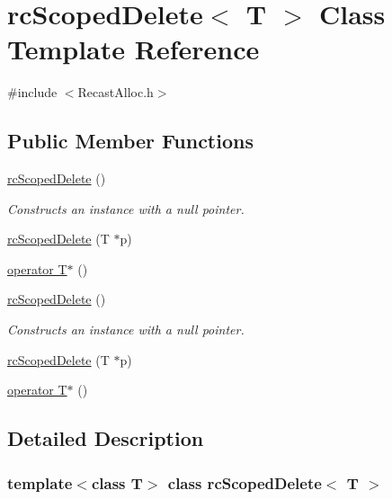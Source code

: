 \hypertarget{classrcScopedDelete}{}\section{rc\+Scoped\+Delete$<$ T $>$ Class Template Reference}
\label{classrcScopedDelete}


{\ttfamily \#include $<$Recast\+Alloc.\+h$>$}

\subsection*{Public Member Functions}
\begin{DoxyCompactItemize}
\item 
\mbox{\label{classrcScopedDelete_a24d9238f78295ccbd1050247030e3741}} 
\hyperlink{classrcScopedDelete_a24d9238f78295ccbd1050247030e3741}{rc\+Scoped\+Delete} ()
\begin{DoxyCompactList}\small\item\em Constructs an instance with a null pointer. \end{DoxyCompactList}\item 
\hyperlink{classrcScopedDelete_a2f096ff87f4d48259dd85360a4218155}{rc\+Scoped\+Delete} (T $\ast$p)
\item 
\hyperlink{classrcScopedDelete_a842c6cc65c3811faead9717aa53166dd}{operator T$\ast$} ()
\item 
\mbox{\label{classrcScopedDelete_a24d9238f78295ccbd1050247030e3741}} 
\hyperlink{classrcScopedDelete_a24d9238f78295ccbd1050247030e3741}{rc\+Scoped\+Delete} ()
\begin{DoxyCompactList}\small\item\em Constructs an instance with a null pointer. \end{DoxyCompactList}\item 
\hyperlink{classrcScopedDelete_a2f096ff87f4d48259dd85360a4218155}{rc\+Scoped\+Delete} (T $\ast$p)
\item 
\hyperlink{classrcScopedDelete_a842c6cc65c3811faead9717aa53166dd}{operator T$\ast$} ()
\end{DoxyCompactItemize}


\subsection{Detailed Description}
\subsubsection*{template$<$class T$>$\newline
class rc\+Scoped\+Delete$<$ T $>$}

